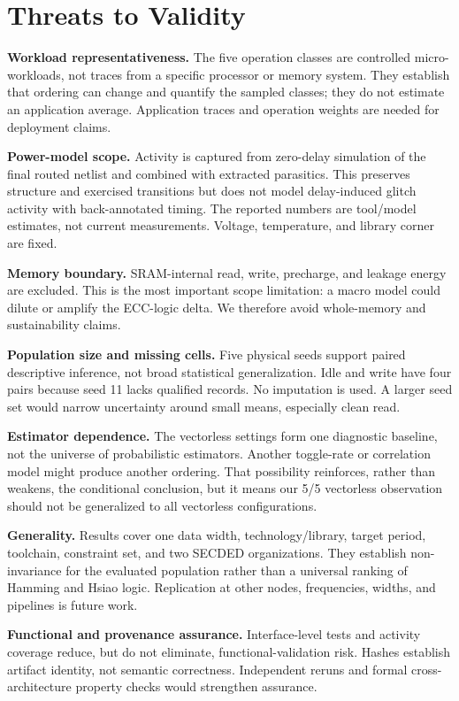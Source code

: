 \documentclass[conference,10pt]{IEEEtran}
\begin{document}
\section{Threats to Validity}
\textbf{Workload representativeness.} The five operation classes are controlled micro-workloads, not traces from a specific processor or memory system. They establish that ordering can change and quantify the sampled classes; they do not estimate an application average. Application traces and operation weights are needed for deployment claims.

\textbf{Power-model scope.} Activity is captured from zero-delay simulation of the final routed netlist and combined with extracted parasitics. This preserves structure and exercised transitions but does not model delay-induced glitch activity with back-annotated timing. The reported numbers are tool/model estimates, not current measurements. Voltage, temperature, and library corner are fixed.

\textbf{Memory boundary.} SRAM-internal read, write, precharge, and leakage energy are excluded. This is the most important scope limitation: a macro model could dilute or amplify the ECC-logic delta. We therefore avoid whole-memory and sustainability claims.

\textbf{Population size and missing cells.} Five physical seeds support paired descriptive inference, not broad statistical generalization. Idle and write have four pairs because seed 11 lacks qualified records. No imputation is used. A larger seed set would narrow uncertainty around small means, especially clean read.

\textbf{Estimator dependence.} The vectorless settings form one diagnostic baseline, not the universe of probabilistic estimators. Another toggle-rate or correlation model might produce another ordering. That possibility reinforces, rather than weakens, the conditional conclusion, but it means our 5/5 vectorless observation should not be generalized to all vectorless configurations.

\textbf{Generality.} Results cover one data width, technology/library, target period, toolchain, constraint set, and two SECDED organizations. They establish non-invariance for the evaluated population rather than a universal ranking of Hamming and Hsiao logic. Replication at other nodes, frequencies, widths, and pipelines is future work.

\textbf{Functional and provenance assurance.} Interface-level tests and activity coverage reduce, but do not eliminate, functional-validation risk. Hashes establish artifact identity, not semantic correctness. Independent reruns and formal cross-architecture property checks would strengthen assurance.
\end{document}
